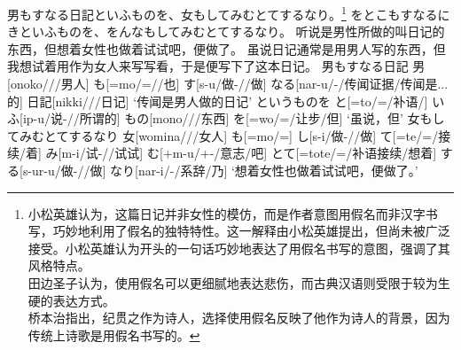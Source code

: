 \pex[tag=id1] 男もすなる日記といふものを、女もしてみむとてするなり。\footnote{%
小松英雄认为，这篇日记并非女性的模仿，而是作者意图用假名而非汉字书写，巧妙地利用了假名的独特特性。这一解释由小松英雄提出，但尚未被广泛接受。小松英雄认为开头的一句话巧妙地表达了用假名书写的意图，强调了其风格特点。\\%
田边圣子认为，使用假名可以更细腻地表达悲伤，而古典汉语则受限于较为生硬的表达方式。\\%
桥本治指出，纪贯之作为诗人，选择使用假名反映了他作为诗人的背景，因为传统上诗歌是用假名书写的。%
}
\a[label=\textbf{\underline{かな}}] 
をとこもすなるにきといふものを、をんなもしてみむとてするなり。
\a[label=\textbf{\underline{直译}}] 
听说是男性所做的叫日记的东西，但想着女性也做着试试吧，便做了。
\a[label=\textbf{\underline{意译}}] 
虽说日记通常是用男人写的东西，但我想试着用作为女人来写写看，于是便写下了这本日记。
\a
\begingl[glstyle=nlevel,glneveryline={\it,\it\footnotesize,\sc\footnotesize,\bfseries\footnotesize},
glnabovelineskip={,-.4ex,-.4ex},extraglskip=0pt,glwordalign=center]
\glpreamble 男もすなる日記
\endpreamble
男[onoko///男人]
も[=mo/=//也]
す[s-u/做-//做]
なる[nar-u/-/传闻证据/传闻是...的]
日記[nikki///日记]
\glft `传闻是男人做的日记'
\endgl
\a
\begingl[glstyle=nlevel,glneveryline={\it,\it\footnotesize,\sc\footnotesize,\bfseries\footnotesize},
glnabovelineskip={,-.4ex,-.4ex},extraglskip=0pt,glwordalign=center]
\glpreamble というものを \endpreamble
と[=to/=/补语/]
いふ[ip-u/说-/{}/所谓的]
もの[mono/{}/{}/东西]
を[=wo/=/让步/但]
\glft `虽说，但'
\endgl
\a
\begingl[glstyle=nlevel,glneveryline={\it,\it\footnotesize,\sc\footnotesize,\bfseries\footnotesize},
glnabovelineskip={,-.4ex,-.4ex},extraglskip=0pt,glwordalign=center]
\glpreamble 女もしてみむとてするなり \endpreamble
女[womina///女人]
も[=mo/=]
し[s-i/做-//做]
て[=te/=/接续/着]
み[m-i/试-//试试]
む[+m-u/+-/意志/吧]
とて[=tote/=/补语接续/想着]
する[s-ur-u/做-//做]
なり[nar-i/-/系辞/乃]
\glft `想着女性也做着试试吧，便做了。'
\endgl
\xe

\newpage
